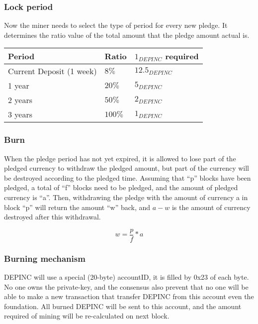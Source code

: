 \subsubsection{Lock period}
\begin{flushleft}
    Now the miner needs to select the type of period for every new pledge. It determines the ratio value of the total amount that the pledge amount actual is.
\end{flushleft}
\begin{tabular}{ |p{5cm}|p{3cm}|p{3.5cm}| }
    \hline
    \rowcolor{lightgray}\textbf{Period} & \textbf{Ratio} & \textbf{$1_{DEPINC}$ required} \\[5pt]
    \hline
    Current Deposit (1 week) & $8\%$ & $12.5_{DEPINC}$ \\[5pt]
    \rowcolor{lightgray!30} 1 year & $20\%$ & $5_{DEPINC}$ \\[5pt]
    2 years & $50\%$ & $2_{DEPINC}$ \\[5pt]
    \rowcolor{lightgray!30} 3 years & $100\%$ & $1_{DEPINC}$ \\[5pt]
    \hline
\end{tabular}
\subsubsection{Burn}
\begin{flushleft}
    When the pledge period has not yet expired, it is allowed to lose part of the pledged currency to withdraw the pledged amount, but part of the currency will be destroyed according to the pledged time. Assuming that ``p'' blocks have been pledged, a total of ``f'' blocks need to be pledged, and the amount of pledged currency is ``a''. Then, withdrawing the pledge with the amount of currency a in block ``p'' will return the amount ``w'' back, and $a-w$ is the amount of currency destroyed after this withdrawal.
\end{flushleft}
\begin{equation}
    w = \frac{p}{f} * a
\end{equation}
\subsubsection{Burning mechanism}
\begin{flushleft}
    DEPINC will use a special (20-byte) accountID, it is filled by 0x23 of each byte. No one owns the private-key, and the consensus also prevent that no one will be able to make a new transaction that transfer DEPINC from this account even the foundation. All burned DEPINC will be sent to this account, and the amount required of mining will be re-calculated on next block.
\end{flushleft}
